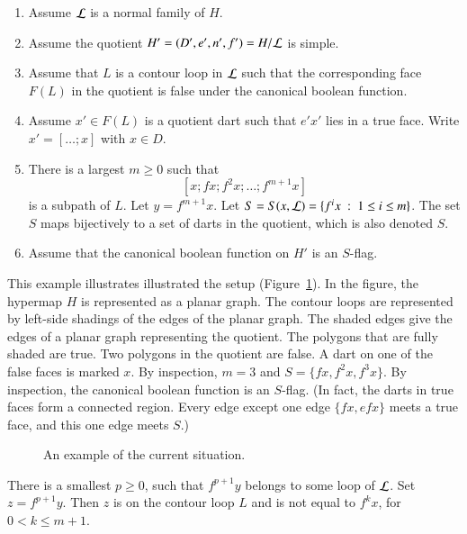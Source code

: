 \begin{remark}[context]\label{enum:context}
\begin{enumerate}
\item Assume $\cal L$ is a normal family of $H$.
\item Assume the quotient $H'=(D',e',n',f')=H/{\cal L}$ is simple.  
\item Assume that $L$ is a contour loop in ${\cal L}$ such that the corresponding face $F(L)$ in the quotient is false under the canonical boolean function.
\item Assume $x'\in F(L)$ is a quotient dart such that $e'x'$ lies in a true face.  Write $x' = [\ldots;x]$ with $x\in D$. 
\item There is a largest $m\ge0$ such that 
$$
[x;f x; f^2 x;\ldots;f^{m+1} x]
$$  
is a subpath of $L$.
Let $y = f^{m+1} x$.  Let $S = S(x,{\cal L}) = \{f^i x \mid 1 \le i\le m\}$.   The set $S$ maps bijectively to a set of darts in the quotient, which is also denoted  $S$. 
\item Assume that the canonical boolean function on $H'$ is an $S$-flag.
\end{enumerate}
\end{remark}

  


\begin{example}\label{ex:graph-gen}  This example illustrates illustrated the setup (Figure~\ref{fig:graph-gen}).   In the figure, the hypermap $H$ is represented as a planar graph.
The contour loops are represented by left-side shadings of the edges of the
planar graph.  The shaded edges give the edges of a planar graph representing the quotient.  The polygons that are fully shaded are true.   Two polygons in the quotient are false.  A dart on one of the false faces is marked $x$.  By inspection, $m=3$ and $S=\{f x,f^2 x,f^3 x\}$.  By inspection, the canonical boolean function is an $S$-flag.  (In fact, the darts in true faces form a connected region.  Every edge except one edge $\{f x, e f x\}$ meets a true face, and this one edge meets $S$.)
\end{example}

\begin{figure}[htb]
  \centering
  \caption{An example of the current situation.}
  \label{fig:graph-gen}
\end{figure}


\begin{lemma}  There is a smallest $p\ge0$, such that $f^{p+1} y$ belongs to some loop of ${\cal L}$.  Set $z=f^{p+1} y$.  Then   $z$ is on the contour loop $L$ and is not equal to $f^k x$, for $0 < k \le {m+1}$.
\end{lemma}

